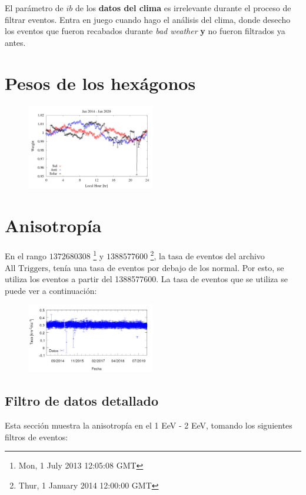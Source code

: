 El parámetro de $ib$ de los \textbf{datos del clima} es irrelevante durante el proceso de filtrar eventos. Entra en juego cuando hago el análisis del clima, donde desecho los eventos que fueron recabados durante \emph{bad weather} \textbf{y} no fueron filtrados ya antes.


\section{Pesos de los hexágonos}

\begin{figure}[H]
	\centering
	\includegraphics[width=0.5\textwidth]{weigth2014-2020_jan.png}
\end{figure}

\section{Anisotropía}

En el rango $1372680308$ \footnote{Mon, 1 July 2013 12:05:08 GMT} y $1388577600$ \footnote{Thur, 1 January 2014 12:00:00 GMT}, la tasa de eventos del archivo $\text{All Triggers}$, tenía una tasa de eventos por debajo de los normal. Por esto, se utiliza los eventos a partir del  1388577600. La tasa de eventos que se utiliza se puede ver  a continuación:

\begin{figure}[H]
	\centering
	\includegraphics[width=0.5\textwidth]{rate_total.png}
\end{figure}


\subsection{Filtro de datos detallado}
Esta sección muestra la anisotropía en el 1 EeV - 2 EeV, tomando los siguientes filtros de eventos:

